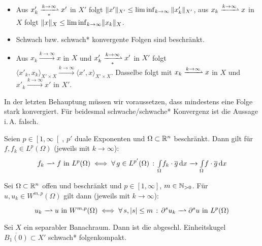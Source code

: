 \documentclass{cheat-sheet}
\newcommand{\IntO}[2]{\Int{\Omega}{}{#1}{#2}} %
\newcommand{\convWith}[1]{\xrightarrow{#1 \to \infty}} %
\newcommand{\convWeaklyWith}[1]{\xrightharpoonup{#1 \to \infty}} %
\newcommand{\convWeaklyStarWith}[1]{\xrightharpoonup[*]{#1 \to \infty}} %
\begin{document}
\begin{lem}
  \begin{itemize}
    \item Aus $x'_k \convWeaklyStarWith{k} x'$ in $X'$ folgt $\lVert x'\rVert_{X'} \leq \liminf_{k \to \infty} \|x'_k\|_{X'}$, aus $x_k \convWeaklyWith{k} x$ in $X$ folgt $\|x\|_X \leq \liminf_{k \to \infty} \lVert x_k\rVert_X$.
    \item Schwach bzw. schwach* konvergente Folgen sind beschränkt.
    \item Aus $x_k \convWith{k} x$ in $X$ und $x'_k \convWeaklyStarWith{k} x'$ in $X'$ folgt $\langle x'_k, x_k \rangle_{X' \times X} \convWith{k} \langle x', x \rangle_{X' \times X}$. Dasselbe folgt mit $x_k \convWeaklyWith{k} x$ in $X$ und $x'_k \convWith{k} x'$ in $X'$.
  \end{itemize}
\end{lem}

\begin{acht}
  In der letzten Behauptung müssen wir voraussetzen, dass mindestens eine Folge stark konvergiert. Für beidesmal schwache/schwache* Konvergenz ist die Aussage i.\,A. falsch.
\end{acht}

\begin{bsp}
  Seien $p \in \left[ 1, \infty \right[$, $p'$ duale Exponenten und $\Omega \subset \mathbb{R}^n$ beschränkt. Dann gilt für $f, f_k \in L^p(\Omega)$ (jeweils mit $k {\to} \infty$):
  \[ f_k \xrightharpoonup{\phantom{A}} f \text{ in } L^p(\Omega) \iff \fa{g \in L^{p'}(\Omega)} \IntO{f_k \cdot \overline{g}}{x} \xrightarrow{\phantom{A}} \IntO{f \cdot \overline{g}}{x} \]
\end{bsp}

\begin{bsp}
  Sei $\Omega \subset \mathbb{R}^n$ offen und beschränkt und $p \in \left[ 1, \infty \right]$, $m \in \mathbb{N}_{> 0}$. Für $u, u_k \in W^{m,p}(\Omega)$ gilt dann (jeweils mit $k {\to} \infty$):
  \[ u_k \xrightharpoonup{\phantom{A}} u \text{ in } W^{m,p}(\Omega) \iff \fa{s, \abs{s} \leq m} \partial^s u_k \xrightharpoonup{\phantom{A}} \partial^s u \text{ in } L^p(\Omega) \]
\end{bsp}

\begin{satz}
  Sei $X$ ein separabler Banachraum. Dann ist die abgeschl. Einheitskugel $\overline{B_1(0)} \subset X'$ schwach* folgenkompakt.
\end{satz}

\end{document}
